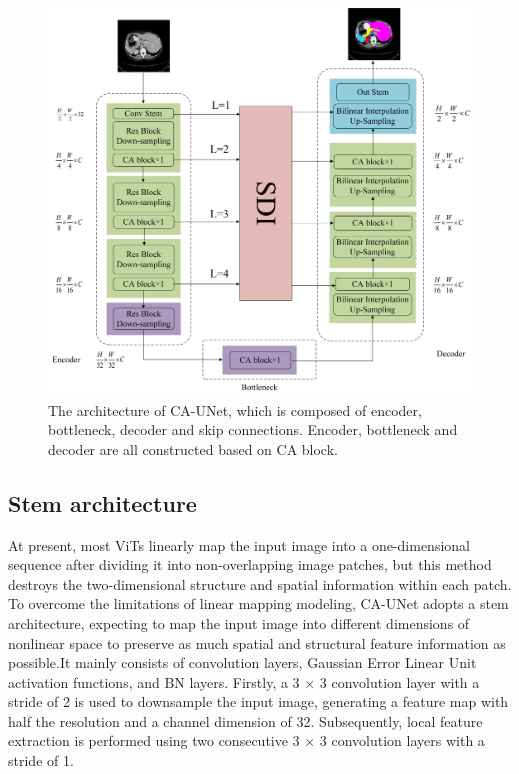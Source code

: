 \begin{figure}[htbp]
\includegraphics[width=\textwidth]{images/CAUNet.png}
\caption{The architecture of CA-UNet, which is composed of encoder, bottleneck, decoder and skip connections. Encoder, bottleneck and decoder are all constructed based on CA block.} \label{ca_unet}
\end{figure}



\subsection{Stem architecture}

At present, most ViTs linearly map the input image into a one-dimensional sequence after dividing it into non-overlapping image patches, but this method destroys the two-dimensional structure and spatial information within each patch. To overcome the limitations of linear mapping modeling, CA-UNet adopts a stem architecture, expecting to map the input image into different dimensions of nonlinear space to preserve as much spatial and structural feature information as possible.It mainly consists of convolution layers, Gaussian Error Linear Unit activation functions, and BN layers. Firstly, a 3 × 3 convolution layer with a stride of 2 is used to downsample the input image, generating a feature map with half the resolution and a channel dimension of 32. Subsequently, local feature extraction is performed using two consecutive 3 × 3 convolution layers with a stride of 1.


